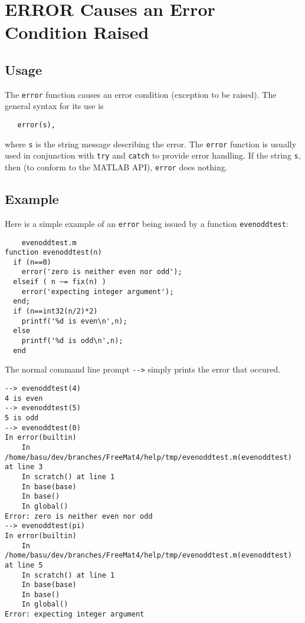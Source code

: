 \section{ERROR Causes an Error Condition Raised}

\subsection{Usage}

The \verb|error| function causes an error condition (exception
to be raised).  The general syntax for its use is
\begin{verbatim}
   error(s),
\end{verbatim}
where \verb|s| is the string message describing the error.  The
\verb|error| function is usually used in conjunction with \verb|try|
and \verb|catch| to provide error handling.  If the string \verb|s|,
then (to conform to the MATLAB API), \verb|error| does nothing.
\subsection{Example}

Here is a simple example of an \verb|error| being issued by a function
\verb|evenoddtest|:
\begin{verbatim}
    evenoddtest.m
function evenoddtest(n)
  if (n==0)
    error('zero is neither even nor odd');
  elseif ( n ~= fix(n) )
    error('expecting integer argument');
  end;
  if (n==int32(n/2)*2)
    printf('%d is even\n',n);
  else
    printf('%d is odd\n',n);
  end
\end{verbatim}
The normal command line prompt \verb|-->| simply prints the error
that occured.
\begin{verbatim}
--> evenoddtest(4)
4 is even
--> evenoddtest(5)
5 is odd
--> evenoddtest(0)
In error(builtin)
    In /home/basu/dev/branches/FreeMat4/help/tmp/evenoddtest.m(evenoddtest) at line 3
    In scratch() at line 1
    In base(base)
    In base()
    In global()
Error: zero is neither even nor odd
--> evenoddtest(pi)
In error(builtin)
    In /home/basu/dev/branches/FreeMat4/help/tmp/evenoddtest.m(evenoddtest) at line 5
    In scratch() at line 1
    In base(base)
    In base()
    In global()
Error: expecting integer argument
\end{verbatim}
